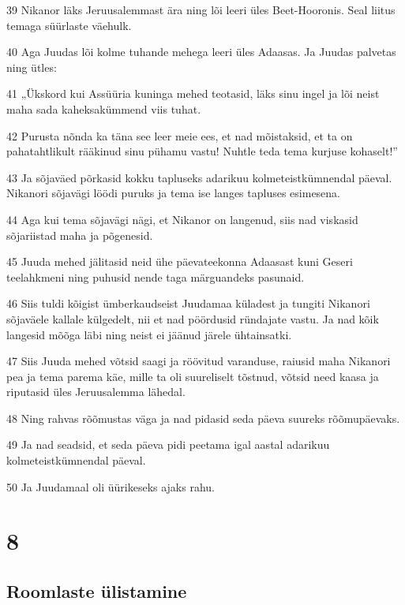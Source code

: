 \par 39 Nikanor läks Jeruusalemmast ära ning lõi leeri üles Beet-Hooronis. Seal liitus temaga süürlaste väehulk.
\par 40 Aga Juudas lõi kolme tuhande mehega leeri üles Adaasas. Ja Juudas palvetas ning ütles:
\par 41 „Ükskord kui Assüüria kuninga mehed teotasid, läks sinu ingel ja lõi neist maha sada kaheksakümmend viis tuhat.
\par 42 Purusta nõnda ka täna see leer meie ees, et nad mõistaksid, et ta on pahatahtlikult rääkinud sinu pühamu vastu! Nuhtle teda tema kurjuse kohaselt!”
\par 43 Ja sõjaväed põrkasid kokku tapluseks adarikuu kolmeteistkümnendal päeval. Nikanori sõjavägi löödi puruks ja tema ise langes tapluses esimesena.
\par 44 Aga kui tema sõjavägi nägi, et Nikanor on langenud, siis nad viskasid sõjariistad maha ja põgenesid.
\par 45 Juuda mehed jälitasid neid ühe päevateekonna Adaasast kuni Geseri teelahkmeni ning puhusid nende taga märguandeks pasunaid.
\par 46 Siis tuldi kõigist ümberkaudseist Juudamaa küladest ja tungiti Nikanori sõjaväele kallale külgedelt, nii et nad pöördusid ründajate vastu. Ja nad kõik langesid mõõga läbi ning neist ei jäänud järele ühtainsatki.
\par 47 Siis Juuda mehed võtsid saagi ja röövitud varanduse, raiusid maha Nikanori pea ja tema parema käe, mille ta oli suureliselt tõstnud, võtsid need kaasa ja riputasid üles Jeruusalemma lähedal.
\par 48 Ning rahvas rõõmustas väga ja nad pidasid seda päeva suureks rõõmupäevaks.
\par 49 Ja nad seadsid, et seda päeva pidi peetama igal aastal adarikuu kolmeteistkümnendal päeval.
\par 50 Ja Juudamaal oli üürikeseks ajaks rahu.

\chapter{8}

\section*{Roomlaste ülistamine}

